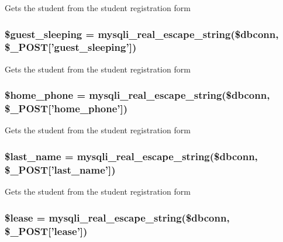 \-Gets the student from the student registration form \hypertarget{admin__view_2validate_2studentVal_8php_a30ca6680bf78675c5916e0c0114191fb}{
\subsubsection[{\$guest\-\_\-sleeping}]{\setlength{\rightskip}{0pt plus 5cm}\$guest\-\_\-sleeping = mysqli\-\_\-real\-\_\-escape\-\_\-string(\$dbconn, \$\-\_\-\-P\-O\-S\-T\mbox{[}'guest\-\_\-sleeping'\mbox{]})}}\label{admin__view_2validate_2studentVal_8php_a30ca6680bf78675c5916e0c0114191fb}
\-Gets the student from the student registration form \hypertarget{admin__view_2validate_2studentVal_8php_af8981335f6e9218851c725816b60158e}{
\subsubsection[{\$home\-\_\-phone}]{\setlength{\rightskip}{0pt plus 5cm}\$home\-\_\-phone = mysqli\-\_\-real\-\_\-escape\-\_\-string(\$dbconn, \$\-\_\-\-P\-O\-S\-T\mbox{[}'home\-\_\-phone'\mbox{]})}}\label{admin__view_2validate_2studentVal_8php_af8981335f6e9218851c725816b60158e}
\-Gets the student from the student registration form \hypertarget{admin__view_2validate_2studentVal_8php_a7aa024f049337e3bb2365d4007262847}{
\subsubsection[{\$last\-\_\-name}]{\setlength{\rightskip}{0pt plus 5cm}\$last\-\_\-name = mysqli\-\_\-real\-\_\-escape\-\_\-string(\$dbconn, \$\-\_\-\-P\-O\-S\-T\mbox{[}'last\-\_\-name'\mbox{]})}}\label{admin__view_2validate_2studentVal_8php_a7aa024f049337e3bb2365d4007262847}
\-Gets the student from the student registration form \hypertarget{admin__view_2validate_2studentVal_8php_ae95126b1133cf958aaf8a31b0283364c}{
\subsubsection[{\$lease}]{\setlength{\rightskip}{0pt plus 5cm}\$lease = mysqli\-\_\-real\-\_\-escape\-\_\-string(\$dbconn, \$\-\_\-\-P\-O\-S\-T\mbox{[}'lease'\mbox{]})}}\label{admin__view_2validate_2studentVal_8php_ae95126b1133cf958aaf8a31b0283364c}
